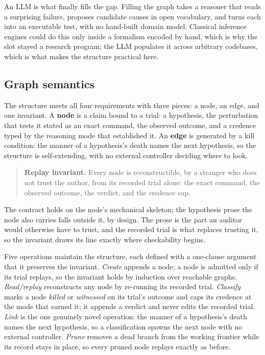 \documentclass[sigconf,review,anonymous]{acmart}
\begin{document}
An LLM is what finally fills the gap. Filling the graph takes a reasoner that reads a surprising failure, proposes candidate causes in open vocabulary, and turns each into an executable test, with no hand-built domain model. Classical inference engines could do this only inside a formalism encoded by hand, which is why the slot stayed a research program; the LLM populates it across arbitrary codebases, which is what makes the structure practical here.

\subsection{Graph semantics}

The structure meets all four requirements with three pieces: a node, an edge, and one invariant. A \textbf{node} is a claim bound to a trial: a hypothesis, the perturbation that tests it stated as an exact command, the observed outcome, and a credence typed by the reasoning mode that established it. An \textbf{edge} is generated by a kill condition: the manner of a hypothesis's death names the next hypothesis, so the structure is self-extending, with no external controller deciding where to look.

\begin{quote}
\textbf{Replay invariant.} Every node is reconstructible, by a stranger who does not trust the author, from its recorded trial alone: the exact command, the observed outcome, the verdict, and the credence cap.
\end{quote}

The contract holds on the node's mechanical skeleton; the hypothesis prose the node also carries falls outside it, by design. The prose is the part an auditor would otherwise have to trust, and the recorded trial is what replaces trusting it, so the invariant draws its line exactly where checkability begins.

Five operations maintain the structure, each defined with a one-clause argument that it preserves the invariant. \emph{Create} appends a node; a node is admitted only if its trial replays, so the invariant holds by induction over reachable graphs. \emph{Read/replay} reconstructs any node by re-running its recorded trial. \emph{Classify} marks a node \emph{killed} or \emph{witnessed} on its trial's outcome and caps its credence at the mode that earned it; it appends a verdict and never edits the recorded trial. \emph{Link} is the one genuinely novel operation: the manner of a hypothesis's death names the next hypothesis, so a classification spawns the next node with no external controller. \emph{Prune} removes a dead branch from the working frontier while its record stays in place, so every pruned node replays exactly as before.
\end{document}
